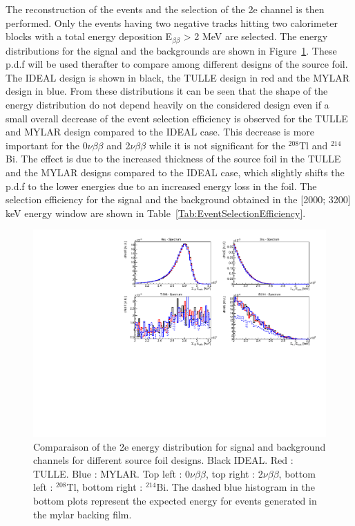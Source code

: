 \documentclass[main.tex]{subfiles}
\begin{document}
\NI The reconstruction of the events and the selection of the 2e channel is then performed. Only the events having two negative tracks hitting two calorimeter blocks with a total energy deposition E$_{\beta\beta}$ > 2 MeV are selected. The energy distributions for the signal and the backgrounds are shown in Figure~\ref{Distribution2eSelection}. These p.d.f will be used therafter to compare among different designs of the source foil. The IDEAL design is shown in black, the TULLE design in red and the MYLAR design in blue. From these distributions it can be seen that the shape of the energy distribution do not depend heavily on the considered design even if a small overall decrease of the event selection efficiency is observed for the TULLE and MYLAR design compared to the IDEAL case. This decrease is more important for the 0$\nu\beta\beta$ and 2$\nu\beta\beta$ while it is not significant for the $^{\text{208}}$Tl and $^{\text{214}}$Bi. The effect is due to the increased thickness of the source foil in the TULLE and the MYLAR designs compared to the IDEAL case, which slightly shifts the p.d.f to the lower energies due to an increased energy loss in the foil. The selection efficiency for the signal and the background obtained in the [2000; 3200] keV energy window are shown in Table~\ref{Tab:EventSelectionEfficiency}.


\begin{figure}[h!]
\centering
\includegraphics[scale=0.65]{pictures/Chap4/Distribution2eSelection_v2.pdf}
\caption{Comparaison of the 2e energy distribution for signal and background channels for different source foil designs. Black IDEAL. Red : TULLE. Blue : MYLAR. Top left : 0$\nu\beta\beta$, top right : 2$\nu\beta\beta$, bottom left : $^{\text{208}}$Tl, bottom right : $^{\text{214}}$Bi. The dashed blue histogram in the bottom plots represent the expected energy for events generated in the mylar backing film.}
\label{Distribution2eSelection}
\end{figure}
\end{document}
